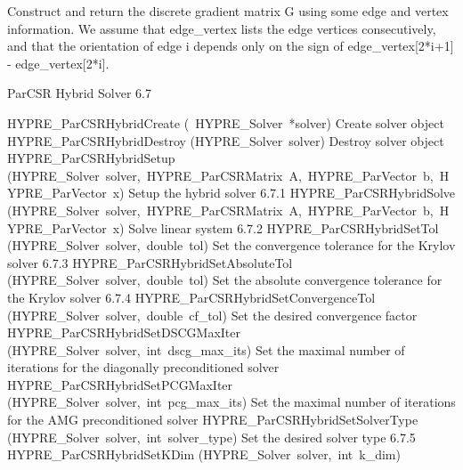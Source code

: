 \documentclass{article}
\begin{document}
\begin{cxxentry}
\begin{cxxentry}
\begin{cxxfunction}
\begin{cxxdoc}
Construct and return the discrete gradient matrix G using some
edge and vertex information. We assume that edge\_vertex lists
the edge vertices consecutively, and that the orientation of edge i
depends only on the sign of edge\_vertex[2*i+1] - edge\_vertex[2*i].
\end{cxxdoc}
\end{cxxfunction}
\end{cxxentry}
\begin{cxxentry}
{}
        {ParCSR Hybrid Solver}
        {}
        {
}
        {6.7}
\begin{cxxnames}
        {HYPRE\_ParCSRHybridCreate}
        {(\ HYPRE\_Solver\ *solver)}
        {
Create solver object}
        {}
\label{cxx.6.7.28}
        {HYPRE\_ParCSRHybridDestroy}
        {(HYPRE\_Solver\ solver)}
        {
Destroy solver object}
        {}
\label{cxx.6.7.29}
        {HYPRE\_ParCSRHybridSetup}
        {(HYPRE\_Solver\ solver,\ HYPRE\_ParCSRMatrix\ A,\ HYPRE\_ParVector\ b,\ HYPRE\_ParVector\ x)}
        {
Setup the hybrid solver
}
        {6.7.1}
        {HYPRE\_ParCSRHybridSolve}
        {(HYPRE\_Solver\ solver,\ HYPRE\_ParCSRMatrix\ A,\ HYPRE\_ParVector\ b,\ HYPRE\_ParVector\ x)}
        {
Solve linear system
}
        {6.7.2}
        {HYPRE\_ParCSRHybridSetTol}
        {(HYPRE\_Solver\ solver,\ double\ tol)}
        {
Set the convergence tolerance for the Krylov solver}
        {6.7.3}
        {HYPRE\_ParCSRHybridSetAbsoluteTol}
        {(HYPRE\_Solver\ solver,\ double\ tol)}
        {
Set the absolute convergence tolerance for the Krylov solver}
        {6.7.4}
        {HYPRE\_ParCSRHybridSetConvergenceTol}
        {(HYPRE\_Solver\ solver,\ double\ cf\_tol)}
        {
Set the desired convergence factor}
        {}
\label{cxx.6.7.30}
        {HYPRE\_ParCSRHybridSetDSCGMaxIter}
        {(HYPRE\_Solver\ solver,\ int\ dscg\_max\_its)}
        {
Set the maximal number of iterations for the diagonally
preconditioned solver}
        {}
\label{cxx.6.7.31}
        {HYPRE\_ParCSRHybridSetPCGMaxIter}
        {(HYPRE\_Solver\ solver,\ int\ pcg\_max\_its)}
        {
Set the maximal number of iterations for the AMG
preconditioned solver}
        {}
\label{cxx.6.7.32}
        {HYPRE\_ParCSRHybridSetSolverType}
        {(HYPRE\_Solver\ solver,\ int\ solver\_type)}
        {
Set the desired solver type}
        {6.7.5}
        {HYPRE\_ParCSRHybridSetKDim}
        {(HYPRE\_Solver\ solver,\ int\ k\_dim)}

\end{cxxnames}
\end{cxxentry}
\end{cxxentry}
\end{document}
